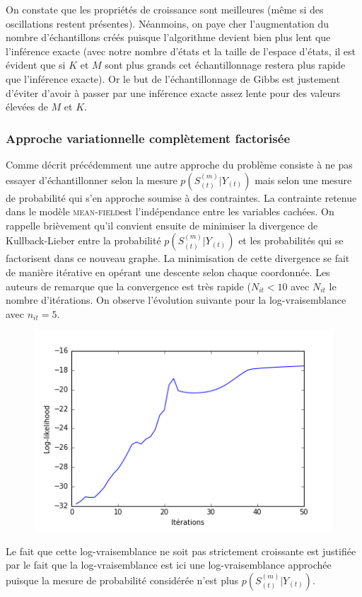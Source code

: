 \documentclass[10pt,a4paper]{article}
\newcommand{\meanfield}{\textsc{mean-field}}
\begin{document}
On constate que les propriétés de croissance sont meilleures (même si des oscillations restent présentes). Néanmoins, on paye cher l'augmentation du nombre d'échantillons créés puisque l'algorithme devient bien plus lent que l'inférence exacte (avec notre nombre d'états et la taille de l'espace d'états, il est évident que si $K$ et $M$ sont plus grands cet échantillonnage restera plus rapide que l'inférence exacte). Or le but de l'échantillonnage de Gibbs est justement d'éviter d'avoir à passer par une inférence exacte assez lente pour des valeurs élevées de $M$ et $K$.
\subsubsection{Approche variationnelle complètement factorisée}
Comme décrit précédemment une autre approche du problème consiste à ne pas essayer d'échantillonner selon la mesure $p(S_{(t)}^{(m)} \vert Y_{(t)})$ mais selon une mesure de probabilité qui s'en approche soumise à des contraintes. La contrainte retenue dans le modèle \meanfield est l'indépendance entre les variables cachées. On rappelle brièvement qu'il convient ensuite de minimiser la divergence de Kullback-Lieber entre la probabilité $p(S_{(t)}^{(m)} \vert Y_{(t)})$ et les probabilités qui se factorisent dans ce nouveau graphe. La minimisation de cette divergence se fait de manière itérative en opérant une descente selon chaque coordonnée. Les auteurs de \cite{ghahramani1997factorial} remarque que la convergence est très rapide ($N_{it}< 10$ avec $N_{it}$ le nombre d'itérations. On observe l'évolution suivante pour la log-vraisemblance avec $n_{it} = 5$.
\begin{figure}[H]
\centering
\includegraphics[scale=0.5]{M3_K2_meanfield.png}
\end{figure}
Le fait que cette log-vraisemblance ne soit pas strictement croissante est justifiée par le fait que la log-vraisemblance est ici une log-vraisemblance approchée puisque la mesure de probabilité considérée n'est plus $p(S_{(t)}^{(m)} \vert Y_{(t)})$.
\label{results}


\end{document}
